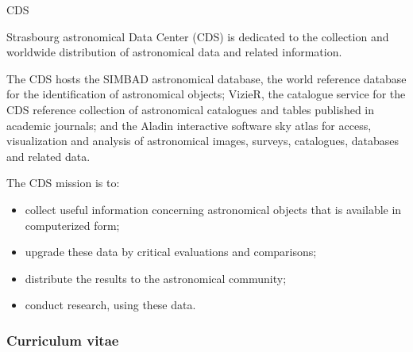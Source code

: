 \begin{sitedescription}{CDS}

Strasbourg astronomical Data Center (CDS) is dedicated to the collection and worldwide distribution of astronomical data and related information.

The CDS hosts the SIMBAD astronomical database, the world reference database for the identification of astronomical objects; VizieR, the catalogue service for the CDS reference collection of astronomical catalogues and tables published in academic journals; and the Aladin interactive software sky atlas for access, visualization and analysis of astronomical images, surveys, catalogues, databases and related data.

The CDS mission is to:

\begin{itemize}
  \item collect useful information concerning astronomical objects that is available in computerized form;
  \item upgrade these data by critical evaluations and comparisons;
  \item distribute the results to the astronomical community;
  \item conduct research, using these data.
\end{itemize}

%

\subsubsection*{Curriculum vitae}


%
%
%



\end{sitedescription}
